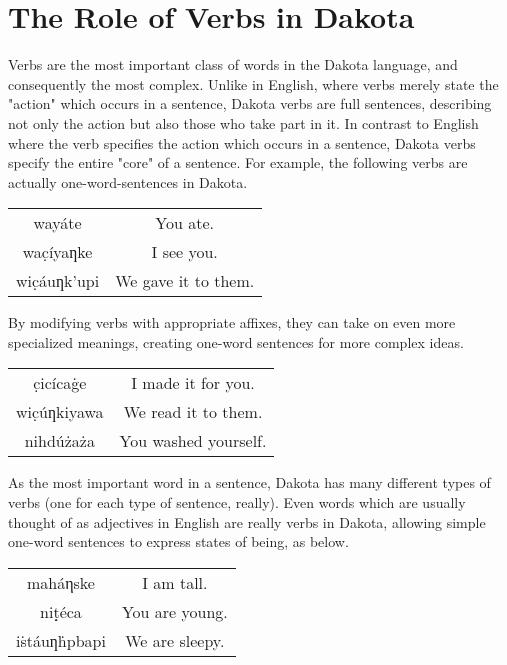 \documentclass[10pt,letter]{article}
\newenvironment{BilingCol}
{\begin{center}\begin{tabular}{>{\dakota}c>{}c}

}
{\end{tabular}\end{center}}
\begin{document}
    \title{\rmfamily\normalfont{}}
    \date{} %
    \maketitle
    

    
    \section{The Role of Verbs in Dakota}

Verbs are the most important class of words in the Dakota language, and consequently the most complex.  Unlike in English, where verbs merely state the "action" which occurs in a sentence, Dakota verbs are full sentences, describing not only the action but also those who take part in it. In contrast to English where the verb specifies the action which occurs in a sentence, Dakota verbs specify the entire "core" of a sentence.  For example, the following verbs are actually one-word-sentences in Dakota. 

\begin{BilingCol}
wayáte & You ate. \\
wac̣íyaƞke & I see you.\\
wic̣áuƞk’upi & We gave it to them.
\end{BilingCol}

By modifying verbs with appropriate affixes, they can take on even more specialized meanings, creating one-word sentences for more complex ideas.

\begin{BilingCol}
c̣icícaġe &  I made it for you. \\
wic̣úƞkiyawa & We read it to them.\\
nihdúżaża & You washed yourself.
\end{BilingCol}

As the most important word in a sentence, Dakota has many different types of verbs (one for each type of sentence, really).  Even words which are usually thought of as adjectives in English are really verbs in Dakota, allowing simple one-word sentences to express states of being, as below.

\begin{BilingCol}
maháηske &  I am tall. \\
niṭ̣éca & You are young.\\
iṡtáuƞḣpbapi & We are sleepy.
\end{BilingCol}
\end{document}
